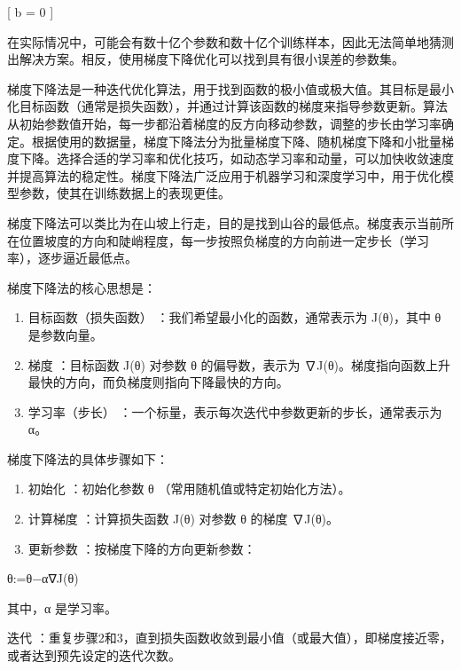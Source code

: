 {[} b = 0 {]}


在实际情况中，可能会有数十亿个参数和数十亿个训练样本，因此无法简单地猜测出解决方案。相反，使用梯度下降优化可以找到具有很小误差的参数集。

梯度下降法是一种迭代优化算法，用于找到函数的极小值或极大值。其目标是最小化目标函数（通常是损失函数），并通过计算该函数的梯度来指导参数更新。算法从初始参数值开始，每一步都沿着梯度的反方向移动参数，调整的步长由学习率确定。根据使用的数据量，梯度下降法分为批量梯度下降、随机梯度下降和小批量梯度下降。选择合适的学习率和优化技巧，如动态学习率和动量，可以加快收敛速度并提高算法的稳定性。梯度下降法广泛应用于机器学习和深度学习中，用于优化模型参数，使其在训练数据上的表现更佳。

梯度下降法可以类比为在山坡上行走，目的是找到山谷的最低点。梯度表示当前所在位置坡度的方向和陡峭程度，每一步按照负梯度的方向前进一定步长（学习率），逐步逼近最低点。

梯度下降法的核心思想是：

\begin{enumerate}
\def\labelenumi{\arabic{enumi}.}
\item
  目标函数（损失函数） ：我们希望最小化的函数，通常表示为 J(θ)，其中 θ
  是参数向量。
\item
  梯度 ：目标函数 J(θ) 对参数 θ 的偏导数，表示为
  ∇J(θ)。梯度指向函数上升最快的方向，而负梯度则指向下降最快的方向。
\item
  学习率（步长） ：一个标量，表示每次迭代中参数更新的步长，通常表示为
  α。
\end{enumerate}

梯度下降法的具体步骤如下：

\begin{enumerate}
\def\labelenumi{\arabic{enumi}.}
\item
  初始化 ：初始化参数 θ （常用随机值或特定初始化方法）。
\item
  计算梯度 ：计算损失函数 J(θ) 对参数 θ 的梯度 ∇J(θ)。
\item
  更新参数 ：按梯度下降的方向更新参数：
\end{enumerate}

θ:=θ−α∇J(θ)

其中，α 是学习率。

迭代
：重复步骤2和3，直到损失函数收敛到最小值（或最大值），即梯度接近零，或者达到预先设定的迭代次数。

